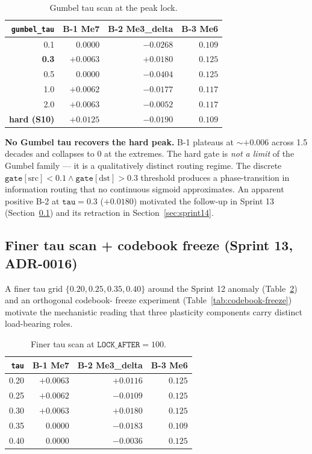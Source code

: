 \documentclass{article}
\begin{document}
\begin{table}[ht]
  \centering
  \caption{Gumbel tau scan at the peak lock.}
  \label{tab:gumbel-tau}
  \begin{tabular}{rrrr}
    \toprule
    \texttt{gumbel\_tau} & B-1 Me7 & B-2 Me3\_delta & B-3 Me6 \\
    \midrule
    0.1 & $0.0000$ & $-0.0268$ & $0.109$ \\
    \textbf{0.3} & $+0.0063$ & $\mathbf{+0.0180}$ & $0.125$ \\
    0.5 & $0.0000$ & $-0.0404$ & $0.125$ \\
    1.0 & $+0.0062$ & $-0.0177$ & $0.117$ \\
    2.0 & $+0.0063$ & $-0.0052$ & $0.117$ \\
    \textbf{hard (S10)} & $\mathbf{+0.0125}$ & $-0.0190$ & $0.109$ \\
    \bottomrule
  \end{tabular}
\end{table}

\textbf{No Gumbel tau recovers the hard peak.} B-1 plateaus at
$\sim +0.006$ across 1.5 decades and collapses to $0$ at the
extremes. The hard gate is \emph{not a limit} of the Gumbel family
--- it is a qualitatively distinct routing regime. The discrete
$\mathtt{gate[\mathrm{src}]} < 0.1 \wedge \mathtt{gate[\mathrm{dst}]} > 0.3$
threshold produces a phase-transition in information routing that
no continuous sigmoid approximates. An apparent positive
B-2 at $\mathtt{tau}=0.3$ ($+0.0180$) motivated the follow-up in
Sprint 13 (Section~\ref{sec:sprint13}) and its retraction in
Section~\ref{sec:sprint14}.

\subsection{Finer tau scan + codebook freeze (Sprint 13, ADR-0016)}
\label{sec:sprint13}

A finer tau grid $\{0.20, 0.25, 0.35, 0.40\}$ around the Sprint 12
anomaly (Table~\ref{tab:finer-tau}) and an orthogonal codebook-
freeze experiment (Table~\ref{tab:codebook-freeze}) motivate the
mechanistic reading that three plasticity components carry
distinct load-bearing roles.

\begin{table}[ht]
  \centering
  \caption{Finer tau scan at $\mathtt{LOCK\_AFTER}=100$.}
  \label{tab:finer-tau}
  \begin{tabular}{rrrr}
    \toprule
    \texttt{tau} & B-1 Me7 & B-2 Me3\_delta & B-3 Me6 \\
    \midrule
    0.20 & $+0.0063$ & $\mathbf{+0.0116}$ & $0.125$ \\
    0.25 & $+0.0062$ & $-0.0109$ & $0.125$ \\
    0.30 & $+0.0063$ & $\mathbf{+0.0180}$ & $0.125$ \\
    0.35 & $0.0000$  & $-0.0183$ & $0.109$ \\
    0.40 & $0.0000$  & $-0.0036$ & $0.125$ \\
    \bottomrule
  \end{tabular}
\end{table}
\end{document}
